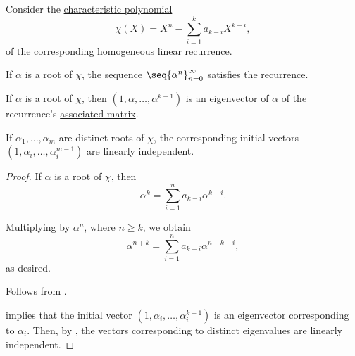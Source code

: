 \begin{proposition}\label{thm:linear_recurrence_characteristic_roots}
  Consider the \hyperref[def:linear_recurrence_characteristic_polynomial]{characteristic polynomial}
  \begin{equation*}
    \chi(X) = X^n - \sum_{i=1}^k a_{k-i} X^{k-i},
  \end{equation*}
  of the corresponding \hyperref[def:homogeneous_linear_recurrence]{homogeneous linear recurrence}.

  \begin{thmenum}
     If \( \alpha \) is a root of \( \chi \), the sequence \( \seq{ \alpha^n }_{n=0}^\infty \) satisfies the recurrence.

     If \( \alpha \) is a root of \( \chi \), then \( (1, \alpha, \ldots, \alpha^{k-1}) \) is an \hyperref[def:eigenpair]{eigenvector} of \( \alpha \) of the recurrence's \hyperref[def:homogeneous_linear_recurrence_matrix]{associated matrix}.

     If \( \alpha_1, \ldots, \alpha_m \) are distinct roots of \( \chi \), the corresponding initial vectors \( (1, \alpha_i, \ldots, \alpha_i^{m-1}) \) are linearly independent.
  \end{thmenum}
\end{proposition}
\begin{proof}
   If \( \alpha \) is a root of \( \chi \), then
  \begin{equation*}
    \alpha^k = \sum_{i=1}^n a_{k-i} \alpha^{k-i}.
  \end{equation*}

  Multiplying by \( \alpha^n \), where \( n \geq k \), we obtain
  \begin{equation*}
    \alpha^{n+k}
    =
    \sum_{i=1}^n a_{k-i} \alpha^{n+k-i},
  \end{equation*}
  as desired.

   Follows from .

    implies that the initial vector \( (1, \alpha_i, \ldots, \alpha_i^{k-1}) \) is an eigenvector corresponding to \( \alpha_i \). Then, by , the vectors corresponding to distinct eigenvalues are linearly independent.
\end{proof}

